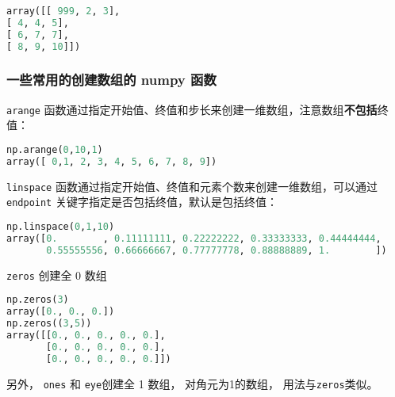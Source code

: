 {\begin{lstlisting}[language=python]
array([[ 999, 2, 3],
[ 4, 4, 5],
[ 6, 7, 7],
[ 8, 9, 10]])
\end{lstlisting}


\subsubsection{一些常用的创建数组的 numpy 函数}
\verb|arange| 函数通过指定开始值、终值和步长来创建一维数组，注意数组\textbf{不包括}终值：
\begin{lstlisting}[language=python]
np.arange(0,10,1)
array([ 0,1, 2, 3, 4, 5, 6, 7, 8, 9])
\end{lstlisting}

\verb|linspace| 函数通过指定开始值、终值和元素个数来创建一维数组，可以通过 \verb|endpoint| 关键字指定是否包括终值，默认是包括终值：
 \begin{lstlisting}[language=python]
np.linspace(0,1,10)
array([0.        , 0.11111111, 0.22222222, 0.33333333, 0.44444444,
       0.55555556, 0.66666667, 0.77777778, 0.88888889, 1.        ])
 \end{lstlisting}

\verb|zeros| 创建全 0 数组
\begin{lstlisting}[language=python]
np.zeros(3)
array([0., 0., 0.])
np.zeros((3,5))
array([[0., 0., 0., 0., 0.],
       [0., 0., 0., 0., 0.],
       [0., 0., 0., 0., 0.]])
\end{lstlisting} 
另外， \verb|ones| 和 \verb|eye|创建全 1 数组， 对角元为1的数组， 用法与\verb|zeros|类似。

}
